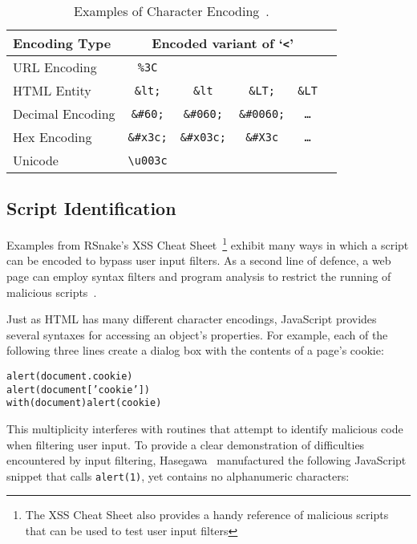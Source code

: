 \begin{table}[ht]
\centering
\begin{tabular}{l|ccccc}
 \textbf{Encoding Type} & \multicolumn{4}{c}{\textbf{Encoded variant of `\texttt{<}'}} \\
 \hline
 URL Encoding           & \texttt{\%3C} &&&\\
 HTML Entity            & \texttt{\&lt;} & \texttt{\&lt} & \texttt{\&LT;} & \texttt{\&LT} \\
 Decimal Encoding       & \texttt{\&\#60;} & \texttt{\&\#060;} & \texttt{\&\#0060;} & \texttt{\ldots} \\
 Hex Encoding           & \texttt{\&\#x3c;} & \texttt{\&\#x03c;} & \texttt{\&\#X3c} & \texttt{\ldots} \\
 Unicode                & \texttt{\textbackslash u003c} &&&\\
\end{tabular}
\caption{Examples of Character Encoding~\cite{kals.etal+06}.}
\label{tab:html-encoding}
\end{table}

\subsection{Script Identification}

Examples from RSnake's XSS Cheat Sheet~\cite{xsscheatsheet}\footnote{The XSS Cheat Sheet also provides a handy reference of malicious scripts that can be used to test user input filters} exhibit many ways in which a script can be encoded to bypass user input filters.
As a second line of defence, a web page can employ syntax filters and program analysis to restrict the running of malicious scripts~\cite{reis.etal+06, yu.etal+07, yaowen.etal+04}.

Just as HTML has many different character encodings, JavaScript provides several syntaxes for accessing an object's properties.
For example, each of the following three lines create a dialog box with the contents of a page's cookie:

\begin{alltt}
alert(document.cookie)
alert(document['cookie'])
with(document) alert(cookie)
\end{alltt}

This multiplicity interferes with routines that attempt to identify malicious code when filtering user input.
To provide a clear demonstration of difficulties encountered by input filtering, Hasegawa~\cite{xssfilters} manufactured the following JavaScript snippet that calls \texttt{alert(1)}, yet contains no alphanumeric characters:

